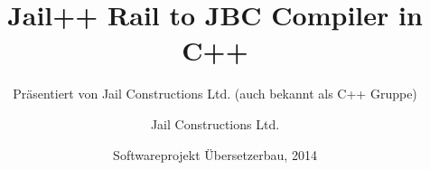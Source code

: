 \documentclass[ucs,9pt]{beamer}
\title[Jail++] %
{\textbf{Jail++} \newline Rail to JBC Compiler in C++}
\subtitle
{Pr\"asentiert von Jail Constructions Ltd. (auch bekannt als C++ Gruppe)}
\author[Jail Constructions Ltd.] %
{Jail Constructions Ltd.}
\institute[FU Berlin] %
{Freie Universität Berlin}
\date[SWP Compilerbau 2014] %
{Softwareprojekt \"Ubersetzerbau, 2014}
\begin{document}
\begin{frame}[plain]
  \titlepage
\end{frame}







\end{document}
